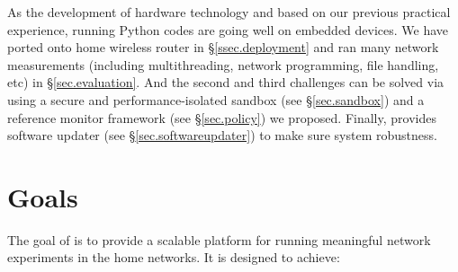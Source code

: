 As the development of hardware technology and based on our previous practical experience, running Python codes are going well on embedded devices. We have ported \sysname onto home wireless router in \S{\ref{ssec.deployment}} and ran many network measurements (including multithreading, network programming, file handling, etc) in \S{\ref{sec.evaluation}}. And the second and third challenges can be solved via using a secure and performance-isolated sandbox (see \S{\ref{sec.sandbox}}) and a reference monitor framework (see \S{\ref{sec.policy}}) we proposed. Finally, \sysname provides software updater (see \S{\ref{sec.softwareupdater}}) to make sure system robustness.

\section{Goals}
\label{ssec.goals}
The goal of \sysname is to provide a scalable platform for running meaningful network experiments in the home networks. It is designed to achieve:

